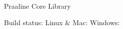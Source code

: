 Praaline Core Library

Build status\+: Linux \& Mac\+: \href{https://travis-ci.org/praaline/praaline-core}{\tt } Windows\+: \href{https://ci.appveyor.com/project/praaline/praaline-core}{\tt } 